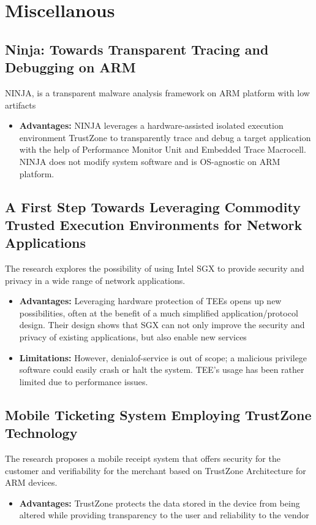 \documentclass[conference]{IEEEtran}
\begin{document}
\section{Miscellanous}

\subsection{Ninja: Towards Transparent Tracing and Debugging on ARM}
\cite{misc1} NINJA, is a transparent malware analysis framework on ARM platform with low artifacts
\begin{itemize}
    \item \textbf{Advantages:} NINJA leverages a hardware-assisted isolated execution environment TrustZone to transparently trace and debug a target application with the help of Performance Monitor Unit and Embedded Trace Macrocell. NINJA does not modify system software and is OS-agnostic on ARM platform.
\end{itemize}


\subsection{A First Step Towards Leveraging Commodity Trusted Execution Environments for Network Applications}
\cite{misc2} The research explores the possibility of using Intel SGX to provide security and privacy in a wide range of network applications.
\begin{itemize}
    \item \textbf{Advantages:} Leveraging hardware protection of TEEs opens up new possibilities, often at the benefit of a much simplified application/protocol design. Their design shows that SGX can not only improve the security and privacy of existing applications, but also enable new services
    \item \textbf{Limitations:} However, denialof-service is out of scope; a malicious privilege software could easily crash or halt the system. TEE’s usage has been rather limited due to performance issues.
\end{itemize}


\subsection{Mobile Ticketing System Employing TrustZone Technology}
\cite{misc3} The research proposes a mobile receipt system that offers security for the customer and verifiability for the merchant based on TrustZone Architecture for ARM devices.
\begin{itemize}
    \item \textbf{Advantages:} TrustZone protects the data stored in the device from being altered while providing transparency to the user and reliability to the vendor
\end{itemize}
\end{document}
